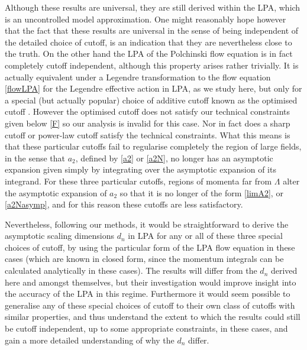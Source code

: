 \documentclass[11pt,a4paper]{article}
\numberwithin{figure}{section}
\numberwithin{equation}{section}
\begin{document}
Although these results are universal, they are still derived within the LPA, which is an uncontrolled model approximation. One might reasonably hope however that the fact that these results are universal in the sense of being independent of the detailed choice of cutoff, is an indication that they are nevertheless close to the truth. On the other hand the LPA \cite{Ball:1994ji} of the Polchinski flow equation \cite{Polchinski:1983gv} is in fact completely cutoff independent, although this property arises rather trivially. It is actually equivalent under a Legendre transformation \cite{Morris:2005ck} to the flow equation \eqref{flowLPA} for the Legendre effective action in LPA, as we study here, but only for a special (but actually popular) choice of additive cutoff known as the optimised cutoff \cite{opt1}. However the optimised cutoff does not satisfy our technical constraints given below \eqref{F} so our analysis is invalid for this case. Nor in fact does a sharp cutoff \cite{NCS,Hasenfratz:1985dm,Morris:1993,Morris:1994ki} or power-law cutoff \cite{Morris:1994ie} satisfy the technical constraints. What this means is that these particular cutoffs fail to regularise completely the region of large fields, in the sense that $a_2$, defined by \eqref{a2} or \eqref{a2N}, no longer has an asymptotic expansion given simply by integrating over the asymptotic expansion of its integrand. For these three particular cutoffs, regions of momenta far from $\Lambda$ alter the
asymptotic expansion of $a_2$ so that it is no longer of the form \eqref{limA2}, or \eqref{a2Nasymp}, and for this reason these cutoffs are less satisfactory.  %

Nevertheless, following our methods, it would be straightforward to derive the asymptotic scaling dimensions $d_n$ in LPA for any or all of these three special choices of cutoff, by using the particular form of the LPA flow equation in these cases (which are known in closed form, since the momentum integrals can be calculated analytically in these cases). The results will differ from the $d_n$ derived here and amongst themselves, but their investigation would improve insight into the accuracy of the LPA in this regime. Furthermore it would seem possible to generalise any of these special choices of cutoff to their own class of cutoffs with similar properties, and thus understand the extent to which the results could still be cutoff independent, up to some appropriate constraints, in these cases, and gain a more detailed understanding of why the $d_n$ differ.
\end{document}
